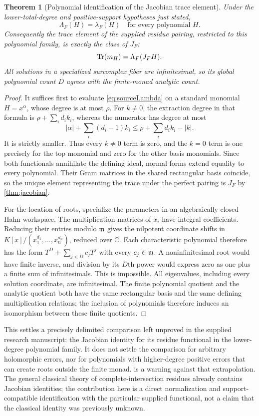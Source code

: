 \documentclass[11pt,letterpaper,oneside]{article}
\numberwithin{equation}{section}
\newtheorem{theorem}{Theorem}[section]
\theoremstyle{definition}
\theoremstyle{remark}\newtheorem{remark}[theorem]{Remark}
\newcommand{\C}{\mathbb C}\newcommand{\R}{\mathbb R}\newcommand{\Q}{\mathbb Q}
\begin{document}
\begin{theorem}[Polynomial identification of the Jacobian trace element]\label{thm:analyticcomparison}
Under the lower-total-degree and positive-support hypotheses just stated,
\begin{equation}\label{eq:residuecomparison}
 \Lambda_F(H)=\lambda_F(H)\quad\text{for every polynomial }H.
\end{equation}
Consequently the trace element of the supplied residue pairing, restricted
to this polynomial family, is exactly the class of $J_F$:
\[
 \operatorname{Tr}(m_H)=\Lambda_F(J_FH).
\]
All solutions in a specialized surcomplex fiber are infinitesimal, so its
global polynomial count $D$ agrees with the finite-monad analytic count.
\end{theorem}
\begin{proof}
It suffices first to evaluate \eqref{eq:sourceLambda} on a standard
monomial $H=x^\alpha$, whose degree is at most $\rho$.
For $k\ne0$, the extraction degree in that formula is
$\rho+\sum_i d_i k_i$, whereas the numerator has degree at most
\[
 |\alpha|+\sum_i(d_i-1)k_i
 \leq\rho+\sum_i d_i k_i-|k|.
\]
It is strictly smaller. Thus every $k\ne0$ term is zero, and the
$k=0$ term is one precisely for the top monomial and zero for the other
basis monomials. Since both functionals annihilate the defining ideal,
normal forms extend equality to every polynomial. Their Gram matrices in
the shared rectangular basis coincide, so the unique element representing
the trace under the perfect pairing is $J_F$ by \cref{thm:jacobian}.

For the location of roots, specialize the parameters in an algebraically
closed Hahn workspace. The multiplication matrices of $x_i$ have integral
coefficients. Reducing their entries modulo $\mathfrak m$ gives the nilpotent
coordinate shifts in $K[x]/(x_1^{d_1},\ldots,x_n^{d_n})$, reduced over
$\C$. Each characteristic polynomial therefore has the form
$T^D+\sum_{j<D}c_jT^j$ with every $c_j\in\mathfrak m$. A noninfinitesimal
root would have finite inverse, and division by its $D$th power would
express zero as one plus a finite sum of infinitesimals. This is impossible.
All eigenvalues, including every solution coordinate, are infinitesimal.
The finite polynomial quotient and the analytic quotient both have the
same rectangular basis and the same defining multiplication relations;
the inclusion of polynomials therefore induces an isomorphism between
these finite quotients.
\end{proof}

This settles a precisely delimited comparison left unproved in the supplied
research manuscript: the Jacobian identity for its residue functional in
the lower-degree polynomial family. It does not settle the comparison for
arbitrary holomorphic errors, nor for polynomials with higher-degree
positive errors that can create roots outside the finite monad.
 is a warning against that extrapolation. The general
classical theory of complete-intersection residues already contains
Jacobian identities; the contribution here is a direct normalization and
support-compatible identification with the particular supplied functional,
not a claim that the classical identity was previously unknown.
\end{document}
